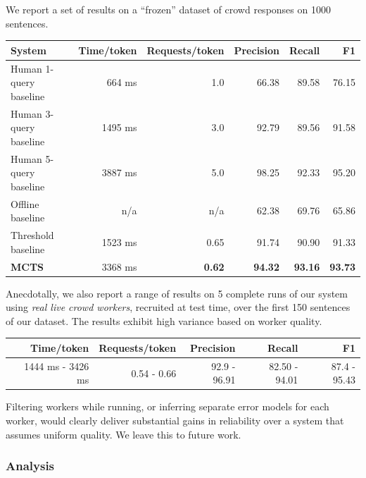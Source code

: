 We report a set of results on a ``frozen'' dataset of crowd responses on 1000 sentences.

\begin{center}
\begin{tabular}{ | l | r | r | r | r | r | }
    \hline
    \textbf{System} & \textbf{Time/token} & \textbf{Requests/token} & \textbf{Precision} & \textbf{Recall} & \textbf{F1} \\ \hline
    Human 1-query baseline & 664 ms & 1.0 & 66.38 & 89.58 & 76.15 \\ \hline
    Human 3-query baseline & 1495 ms & 3.0 & 92.79 & 89.56 & 91.58 \\ \hline
    Human 5-query baseline & 3887 ms & 5.0 & 98.25 & 92.33 & 95.20 \\ \hline
    Offline baseline & n/a & n/a & 62.38 & 69.76 & 65.86 \\ \hline
    Threshold baseline & 1523 ms & 0.65 & 91.74 & 90.90 & 91.33 \\ \hline
    \textbf{MCTS} & 3368 ms & \textbf{0.62} & \textbf{94.32} & \textbf{93.16} & \textbf{93.73} \\ \hline
\end{tabular}
\end{center}

Anecdotally, we also report a range of results on 5 complete runs of our system using {\em real live crowd workers}, recruited at test time, over the first 150 sentences of our dataset. The results exhibit high variance based on worker quality.

\begin{center}
\begin{tabular}{ | r | r | r | r | r | }
    \hline
    Time/token & Requests/token & Precision & Recall & F1 \\ \hline
    1444 ms - 3426 ms & 0.54 - 0.66 & 92.9 - 96.91 & 82.50 - 94.01 & 87.4 - 95.43 \\ \hline
\end{tabular}
\end{center}

Filtering workers while running, or inferring separate error models for each worker, would clearly deliver substantial gains in reliability over a system that assumes uniform quality. We leave this to future work.

\subsubsection{Analysis}


